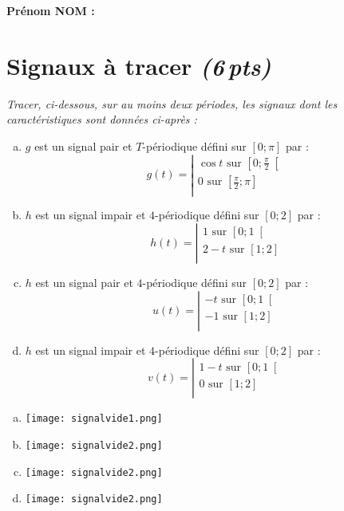 \documentclass[a4paper,11pt]{article}
\date{}
\author{}
\title{}
\begin{document}
\begin{center} \Huge{\color{colortitle1}}\normalsize \end{center}
\textbf{Prénom NOM :}\hrulefill
\section{Signaux à tracer \emph{(6\,pts)}}
\emph{Tracer, ci-dessous, sur au moins deux périodes, les signaux dont les caractéristiques sont données ci-après :}
\begin{multicols}{2}
\begin{enumerate}[a)]
\item $g$ est un signal pair et $T$-périodique défini sur $\left[ 0;\pi \right]$ par :
$$g(t)=\left|\begin{array}{l} \cos t  \textrm{~sur~} \left[ 0; \frac{\pi}{2}\right[  \\
			     0\textrm{~sur~} \left[ \frac{\pi}{2} ; \pi \right]  \\ 
				      	\end{array} \right.$$
\item  $h$ est un signal impair et $4$-périodique défini sur $\left[ 0; 2 \right]$ par :
$$h(t)=\left|\begin{array}{l}  1 \textrm{~sur~} \left[ 0 ; 1 \right[  \\
				2-t   \textrm{~sur~} \left[ 1 ; 2\right]  \\ 
				      	\end{array} \right.$$
\item  $h$ est un signal pair et $4$-périodique défini sur $\left[ 0; 2 \right]$ par :
$$u(t)=\left|\begin{array}{l}  -t \textrm{~sur~} \left[ 0 ; 1 \right[  \\
				-1   \textrm{~sur~} \left[ 1 ; 2\right]  \\ 
				      	\end{array} \right.$$
\item  $h$ est un signal impair et $4$-périodique défini sur $\left[ 0; 2 \right]$ par :
$$v(t)=\left|\begin{array}{l}  1-t \textrm{~sur~} \left[ 0 ; 1 \right[  \\
				0   \textrm{~sur~} \left[ 1 ; 2\right]  \\ 
				      	\end{array} \right.$$
\end{enumerate}
\end{multicols}
\begin{enumerate}[a)]
\item \texttt{[image: signalvide1.png]}\\
\item \texttt{[image: signalvide2.png]}\\
\item \texttt{[image: signalvide2.png]}\\
\item \texttt{[image: signalvide2.png]}\\
\end{enumerate}
\end{document}
